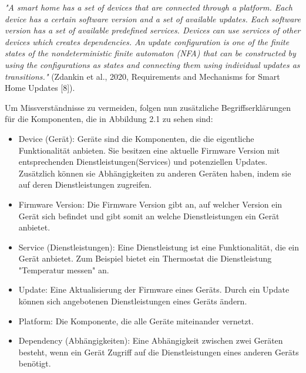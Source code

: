 \par
\begingroup
\leftskip=1cm %
\noindent %
\textit{"A smart home has a set of devices that are connected through
a platform. Each device has a certain software version and
a set of available updates. Each software version has a set
of available predefined services. Devices can use services of
other devices which creates dependencies. An update configuration
is one of the finite states of the nondeterministic
finite automaton (NFA) that can be constructed by using the
configurations as states and connecting them using individual
updates as transitions." }(Zdankin et al., 2020, Requirements and Mechanisms for Smart Home Updates [8]).
\par
\endgroup
Um Missverständnisse zu vermeiden, folgen nun zusätzliche Begriffserklärungen für die Komponenten, die in
Abbildung 2.1 zu sehen sind:
\begin{itemize}
\item Device (Gerät): Geräte sind die Komponenten, die die eigentliche Funktionalität anbieten. Sie besitzen eine aktuelle Firmware
Version mit entsprechenden Dienstleistungen(Services) und potenziellen Updates. Zusätzlich können sie Abhängigkeiten zu anderen Geräten haben, indem sie auf deren
Dienstleistungen zugreifen.
\item Firmware Version: Die Firmware Version gibt an, auf welcher Version ein Gerät sich befindet und gibt somit an welche Dienstleistungen ein Gerät anbietet.
\item Service (Dienstleistungen): Eine Dienstleistung ist eine Funktionalität, die ein Gerät anbietet. Zum Beispiel bietet ein Thermostat
die Dienstleistung "Temperatur messen" an.
\item Update: Eine Aktualisierung der Firmware eines Geräts. Durch ein Update können sich angebotenen Dienstleistungen eines Geräts ändern.
\item Platform: Die Komponente, die alle Geräte miteinander vernetzt.
\item Dependency (Abhängigkeiten): Eine Abhängigkeit zwischen zwei Geräten besteht, wenn ein Gerät Zugriff auf die Dienstleistungen eines
anderen Geräts benötigt.
\end{itemize}

